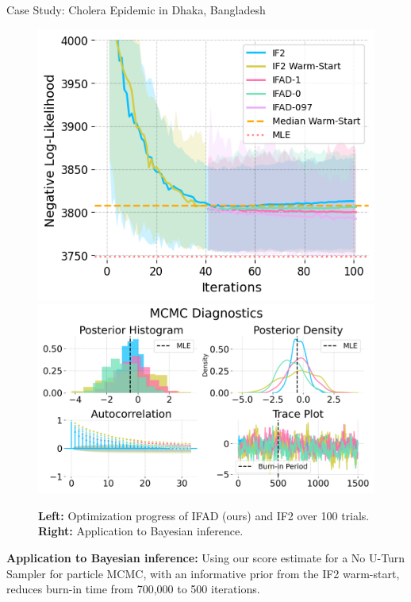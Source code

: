 \documentclass[final]{beamer}
\newlength{\colwidth}
\begin{document}
\begin{frame}[t]
\begin{columns}[t]
\begin{column}{\colwidth}
\begin{exampleblock}{Case Study: Cholera Epidemic in Dhaka, Bangladesh}
\begin{figure}[H]
    \centering
    \includegraphics[scale=0.815]{imgs/095/optim.png}
    \includegraphics[scale=0.562]{imgs/pmcmc/nuts_eb.png}
    \caption{\textbf{Left:} Optimization progress of IFAD (ours) and IF2 \cite{ionides15} over 100 trials. \textbf{Right:} Application to Bayesian inference. 
    }
\end{figure}

    \textbf{Application to Bayesian inference:} Using our score estimate for a No U-Turn Sampler for particle MCMC, with an informative prior from the IF2 warm-start, reduces burn-in time from 700,000 \cite{fasiolo16} to 500 iterations.
  \end{exampleblock}


\vspace{-2ex}
  
\begin{block}{}
  \vspace{-0.5ex}
    \tiny{
    }
\end{block}




\end{column}
\end{columns}
\end{frame}
\end{document}
